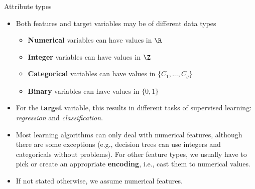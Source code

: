 
\begin{vbframe}{Attribute types}

\begin{itemize}

  \item Both features and target variables may be of different data types

  \begin{itemize}

    \item \textbf{Numerical} variables can have values in $\R$

    \item \textbf{Integer} variables can have values in $\Z$

    \item \textbf{Categorical} variables can have values in $\{C_1,...,C_g\}$

    \item \textbf{Binary} variables can have values in $\{0, 1\}$

  \end{itemize}

  \item For the \textbf{target} variable, this results in different tasks of supervised learning: \textit{regression} and \textit{classification}.

  \item Most learning algorithms can only deal with numerical features,
      although there are some exceptions (e.g., decision trees can use integers and categoricals without problems).
      For other feature types, we usually have to pick or create an
      appropriate \textbf{encoding}, i.e., cast them to numerical values.
  \item If not stated otherwise, we assume numerical features.

\end{itemize}

\end{vbframe}



